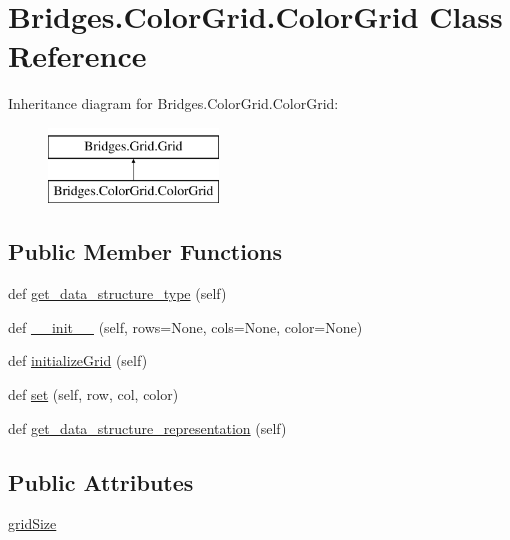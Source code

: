 \hypertarget{class_bridges_1_1_color_grid_1_1_color_grid}{}\section{Bridges.\+Color\+Grid.\+Color\+Grid Class Reference}
\label{class_bridges_1_1_color_grid_1_1_color_grid}
Inheritance diagram for Bridges.\+Color\+Grid.\+Color\+Grid\+:\begin{figure}[H]
\begin{center}
\leavevmode
\includegraphics[height=2.000000cm]{class_bridges_1_1_color_grid_1_1_color_grid}
\end{center}
\end{figure}
\subsection*{Public Member Functions}
\begin{DoxyCompactItemize}
\item 
def \mbox{\hyperlink{class_bridges_1_1_color_grid_1_1_color_grid_a34e609e12f3f5fa2bf8917b2bd2b5489}{get\+\_\+data\+\_\+structure\+\_\+type}} (self)
\item 
def \mbox{\hyperlink{class_bridges_1_1_color_grid_1_1_color_grid_abe3330968006d02bf8eecdb73109fffc}{\+\_\+\+\_\+init\+\_\+\+\_\+}} (self, rows=None, cols=None, color=None)
\item 
def \mbox{\hyperlink{class_bridges_1_1_color_grid_1_1_color_grid_add4d644d5a7703acf2569a6fdd95f814}{initialize\+Grid}} (self)
\item 
def \mbox{\hyperlink{class_bridges_1_1_color_grid_1_1_color_grid_a0389bb1397a02cc665214f91e9c359a2}{set}} (self, row, col, color)
\item 
def \mbox{\hyperlink{class_bridges_1_1_color_grid_1_1_color_grid_a995dc5674b9fb6c405cd78f5db78f3ab}{get\+\_\+data\+\_\+structure\+\_\+representation}} (self)
\end{DoxyCompactItemize}
\subsection*{Public Attributes}
\begin{DoxyCompactItemize}
\item 
\mbox{\hyperlink{class_bridges_1_1_color_grid_1_1_color_grid_acdd1af0874b83b5b77c75ff6747102cc}{grid\+Size}}
\end{DoxyCompactItemize}
